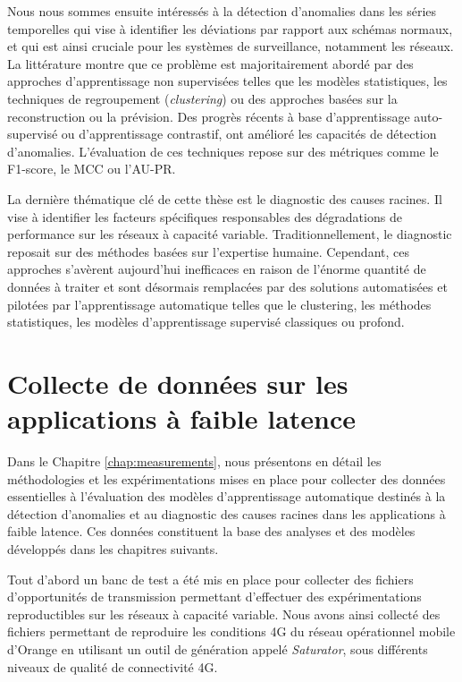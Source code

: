 Nous nous sommes ensuite intéressés à la détection d'anomalies dans les séries temporelles qui vise à identifier les déviations par rapport aux schémas normaux, et qui est ainsi cruciale pour les systèmes de surveillance, notamment les réseaux. La littérature montre que ce problème est majoritairement abordé par des approches d'apprentissage non supervisées telles que les modèles statistiques, les techniques de regroupement (\textit{clustering}) ou des approches basées sur la reconstruction ou la prévision. Des progrès récents à base d’apprentissage auto-supervisé ou d’apprentissage contrastif, ont amélioré les capacités de détection d'anomalies. L’évaluation de ces techniques repose sur des métriques comme le F1-score, le MCC ou l’AU-PR.

La dernière thématique clé de cette thèse est le diagnostic des causes racines. Il vise à identifier les facteurs spécifiques responsables des dégradations de performance sur les réseaux à capacité variable. Traditionnellement, le diagnostic reposait sur des méthodes basées sur l'expertise humaine. Cependant, ces approches s'avèrent aujourd'hui inefficaces en raison de l'énorme quantité de données à traiter et sont désormais remplacées par des solutions automatisées et pilotées par l’apprentissage automatique telles que le clustering, les méthodes statistiques, les modèles d'apprentissage supervisé classiques ou profond.


\section*{Collecte de données sur les applications à faible latence}
Dans le Chapitre \ref{chap:measurements}, nous présentons en détail les méthodologies et les expérimentations mises en place pour collecter des données essentielles à l’évaluation des modèles d’apprentissage automatique destinés à la détection d’anomalies et au diagnostic des causes racines dans les applications à faible latence. Ces données constituent la base des analyses et des modèles développés dans les chapitres suivants.

Tout d'abord un banc de test a été mis en place pour collecter des fichiers d'opportunités de transmission permettant d'effectuer des expérimentations reproductibles sur les réseaux à capacité variable. Nous avons ainsi collecté des fichiers permettant de reproduire les conditions 4G du réseau opérationnel mobile d'Orange en utilisant un outil de génération appelé \textit{Saturator}, sous différents niveaux de qualité de connectivité 4G.

